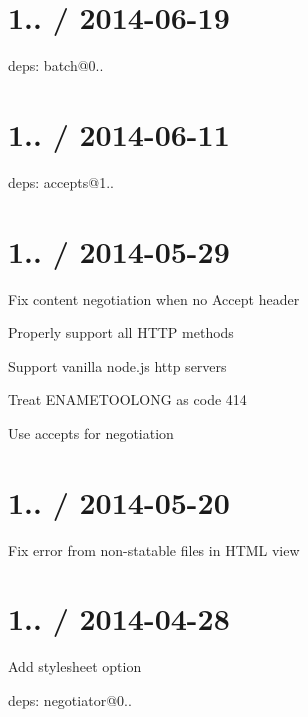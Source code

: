 \section*{1.. / 2014-\/06-\/19 }


\begin{DoxyItemize}
\item deps\+: batch@0..
\end{DoxyItemize}

\section*{1.. / 2014-\/06-\/11 }


\begin{DoxyItemize}
\item deps\+: accepts@1..
\end{DoxyItemize}

\section*{1.. / 2014-\/05-\/29 }


\begin{DoxyItemize}
\item Fix content negotiation when no {\ttfamily Accept} header
\item Properly support all H\+T\+TP methods
\item Support vanilla node.\+js http servers
\item Treat {\ttfamily E\+N\+A\+M\+E\+T\+O\+O\+L\+O\+NG} as code 414
\item Use accepts for negotiation
\end{DoxyItemize}

\section*{1.. / 2014-\/05-\/20 }


\begin{DoxyItemize}
\item Fix error from non-\/statable files in H\+T\+ML view
\end{DoxyItemize}

\section*{1.. / 2014-\/04-\/28 }


\begin{DoxyItemize}
\item Add {\ttfamily stylesheet} option
\item deps\+: negotiator@0..
\end{DoxyItemize}

